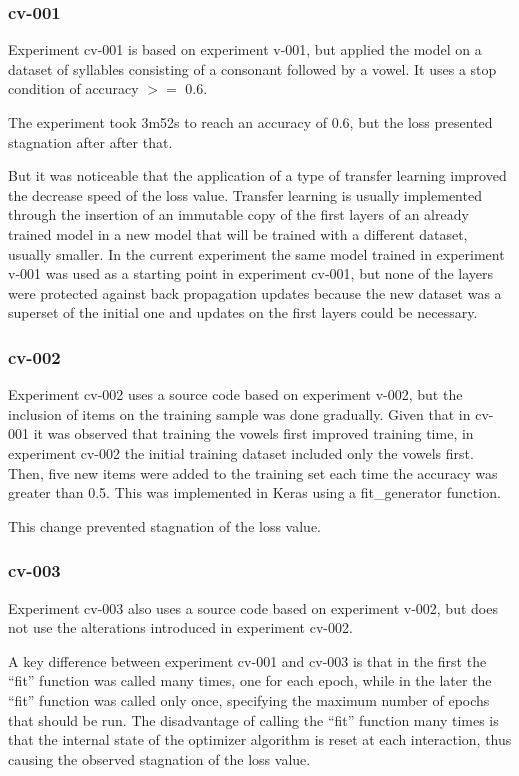 \subsubsection{cv-001}
Experiment cv-001 is based on experiment v-001, but applied the model on a dataset of syllables consisting of a consonant followed by a vowel. It uses a stop condition of accuracy $>=$ 0.6.

The experiment took 3m52s to reach an accuracy of 0.6, but the loss presented stagnation after after that.

But it was noticeable that the application of a type of transfer learning improved the decrease speed of the loss value. Transfer learning is usually implemented through the insertion of an immutable copy of the first layers of an already trained model in a new model that will be trained with a different dataset, usually smaller. In the current experiment the same model trained in experiment v-001 was used as a starting point in experiment cv-001, but none of the layers were protected against back propagation updates because the new dataset was a superset of the initial one and updates on the first layers could be necessary.


\subsubsection{cv-002}

Experiment cv-002 uses a source code based on  experiment v-002, but the inclusion of items on the training sample was done gradually. Given that in cv-001 it was observed that training the vowels first improved training time, in experiment cv-002 the initial training dataset included only the vowels first. Then, five new items were added to the training set each time the accuracy was greater than 0.5. This was implemented in Keras using a fit\_generator function.

This change prevented stagnation of the loss value.


\subsubsection{cv-003}
Experiment cv-003 also uses a source code based on experiment v-002, but does not use the alterations introduced in experiment cv-002.

A key difference between experiment cv-001 and cv-003 is that in the first the ``fit'' function was called many times, one for each epoch, while in the later the ``fit'' function was called only once, specifying the maximum number of epochs that should be run. The disadvantage of calling the ``fit'' function many times is that the internal state of the optimizer algorithm is reset at each interaction, thus causing the observed stagnation of the loss value.


